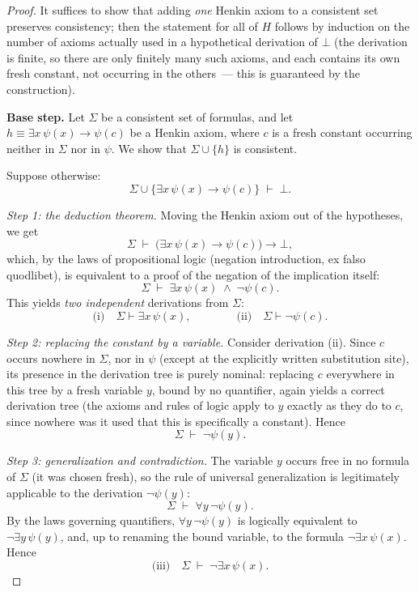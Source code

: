 \documentclass[12pt, a4paper]{article}
\theoremstyle{plain}
\theoremstyle{definition}
\newcommand{\proves}{\vdash}
\begin{document}
\begin{proof}
It suffices to show that adding \emph{one} Henkin axiom
to a consistent set preserves consistency; then
the statement for all of $H$ follows by induction on the number of axioms
actually used in a hypothetical derivation of $\bot$
(the derivation is finite, so there are only finitely many such axioms, and each
contains its own fresh constant, not occurring
in the others~--- this is guaranteed by the construction).

\smallskip
\noindent\textbf{Base step.}
Let $\Sigma$ be a consistent set of formulas, and let
$h \equiv \exists x\,\psi(x) \to \psi(c)$ be a Henkin axiom, where
$c$ is a fresh constant occurring neither in $\Sigma$ nor in $\psi$.
We show that $\Sigma \cup \{h\}$ is consistent.

Suppose otherwise:
\[
  \Sigma \cup \bigl\{\exists x\,\psi(x) \to \psi(c)\bigr\} \;\proves\; \bot.
\]

\textit{Step 1: the deduction theorem.}
Moving the Henkin axiom out of the hypotheses, we get
\[
  \Sigma \;\proves\; \bigl(\exists x\,\psi(x) \to \psi(c)\bigr) \to \bot,
\]
which, by the laws of propositional logic (negation introduction,
ex falso quodlibet), is equivalent to a proof of the negation
of the implication itself:
\[
  \Sigma \;\proves\; \exists x\,\psi(x) \;\wedge\; \neg\psi(c).
\]
This yields \emph{two independent} derivations from $\Sigma$:
\[
  \text{(i)}\quad \Sigma \proves \exists x\,\psi(x),
  \qquad\qquad
  \text{(ii)}\quad \Sigma \proves \neg\psi(c).
\]

\textit{Step 2: replacing the constant by a variable.}
Consider derivation (ii). Since $c$ occurs nowhere in $\Sigma$,
nor in $\psi$ (except at the explicitly written substitution site), its presence
in the derivation tree is purely nominal: replacing $c$ everywhere in this tree by a
fresh variable $y$, bound by no quantifier, again yields
a correct derivation tree (the axioms and rules of logic apply
to $y$ exactly as they do to $c$, since nowhere was it used
that this is specifically a constant). Hence
\[
  \Sigma \;\proves\; \neg\psi(y).
\]

\textit{Step 3: generalization and contradiction.}
The variable $y$ occurs free in no formula of $\Sigma$ (it
was chosen fresh), so the rule of universal generalization is legitimately
applicable to the derivation $\neg\psi(y)$:
\[
  \Sigma \;\proves\; \forall y\,\neg\psi(y).
\]
By the laws governing quantifiers, $\forall y\,\neg\psi(y)$ is logically
equivalent to $\neg\exists y\,\psi(y)$, and, up to renaming the
bound variable, to the formula $\neg\exists x\,\psi(x)$. Hence
\[
  \text{(iii)}\quad \Sigma \;\proves\; \neg\exists x\,\psi(x).
\]


\end{proof}
\end{document}
